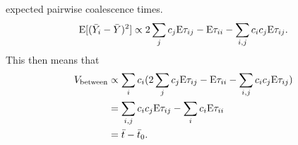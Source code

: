 expected pairwise coalescence times.
\begin{equation}
  \mathrm{E}[(\bar{Y}_i - \bar{Y})^2] \propto 2\sum_{j} c_j \mathrm{E} \tau_{ij} -
  \mathrm{E} \tau_{ii} - \sum_{i,j} c_ic_j \mathrm{E} \tau_{ij}.
\end{equation}
This then means that
\begin{align}
  V_{\text{between}} &\propto \sum_i c_i (2\sum_{j} c_j \mathrm{E} \tau_{ij} -
  \mathrm{E} \tau_{ii} - \sum_{i,j} c_ic_j \mathrm{E} \tau_{ij}) \\
  &= \sum_{i,j} c_ic_j \mathrm{E} \tau_{ij} - \sum_i c_i \mathrm{E} \tau_{ii} \\
  &= \bar{t} - \bar{t}_0.
\end{align}
